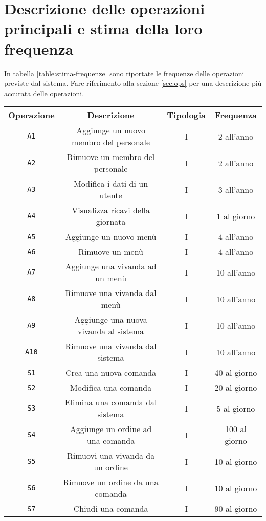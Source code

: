 \documentclass[a4paper,12pt]{report}
\begin{document}
\section{Descrizione delle operazioni principali e stima della loro frequenza}
In tabella \ref{table:stima-frequenze} sono riportate le frequenze delle operazioni previste dal sistema. Fare riferimento alla sezione \ref{sec:ops} per una descrizione più accurata delle operazioni.

\begin{table}[H]
\begin{center}
\begin{tabular}{||c | c | c | c ||} 
 \hline
 Operazione & Descrizione & Tipologia & Frequenza\\
 \hline\hline
    \texttt{A1} & Aggiunge un nuovo membro del personale & I & 2 all'anno \\
    \texttt{A2} & Rimuove un membro del personale & I & 2 all'anno\\
    \texttt{A3} & Modifica i dati di un utente & I & 3 all'anno\\
    \texttt{A4} & Visualizza ricavi della giornata & I & 1 al giorno\\
    \texttt{A5} & Aggiunge un nuovo menù & I & 4 all'anno\\
    \texttt{A6} & Rimuove un menù & I & 4 all'anno \\
    \texttt{A7} & Aggiunge una vivanda ad un menù & I & 10 all'anno\\
    \texttt{A8} & Rimuove una vivanda dal menù & I & 10 all'anno\\
    \texttt{A9} & Aggiunge una nuova vivanda al sistema & I & 10 all'anno\\
    \texttt{A10} & Rimuove una vivanda dal sistema & I & 10 all'anno\\
    \texttt{S1} & Crea una nuova comanda  & I & 40 al giorno\\
    \texttt{S2} & Modifica una comanda & I & 20 al giorno \\
    \texttt{S3} & Elimina una comanda dal sistema & I & 5 al giorno\\
    \texttt{S4} & Aggiunge un ordine ad una comanda & I & 100 al giorno\\
    \texttt{S5} & Rimuovi una vivanda da un ordine & I & 10 al giorno\\
    \texttt{S6} & Rimuove un ordine da una comanda & I & 10 al giorno\\
    \texttt{S7} & Chiudi una comanda & I & 90 al giorno\\

\end{tabular}
\end{center}
\end{table}
\end{document}
